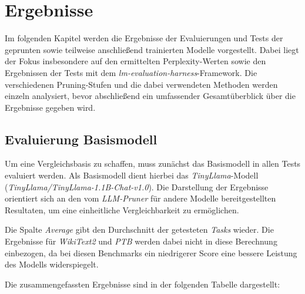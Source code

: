 \section{Ergebnisse}\label{ergebnisse}

Im folgenden Kapitel werden die Ergebnisse der Evaluierungen und Tests der
geprunten sowie teilweise anschließend trainierten Modelle vorgestellt. Dabei
liegt der Fokus insbesondere auf den ermittelten Perplexity-Werten sowie den
Ergebnissen der Tests mit dem \emph{lm-evaluation-harness}-Framework. Die
verschiedenen Pruning-Stufen und die dabei verwendeten Methoden werden einzeln
analysiert, bevor abschließend ein umfassender Gesamtüberblick über die
Ergebnisse gegeben wird.

\subsection{Evaluierung Basismodell}\label{evaluation-basemodel}

Um eine Vergleichsbasis zu schaffen, muss zunächst das Basismodell in allen
Tests evaluiert werden. Als Basismodell dient hierbei das
\emph{TinyLlama}-Modell (\emph{TinyLlama/TinyLlama-1.1B-Chat-v1.0}). Die
Darstellung der Ergebnisse orientiert sich an den vom \emph{LLM-Pruner} für
andere Modelle bereitgestellten Resultaten, um eine einheitliche
Vergleichbarkeit zu ermöglichen.

Die Spalte \emph{Average} gibt den Durchschnitt der getesteten \emph{Tasks}
wieder. Die Ergebnisse für \emph{WikiText2} und \emph{PTB} werden dabei nicht in
diese Berechnung einbezogen, da bei diesen Benchmarks ein niedrigerer Score eine
bessere Leistung des Modells widerspiegelt.

Die zusammengefassten Ergebnisse sind in der folgenden Tabelle
dargestellt:

\begin{table}[h]
	\centering
	\caption{Evaluierung des Basismodells}
	\label{tab:pruning}
\end{table}


